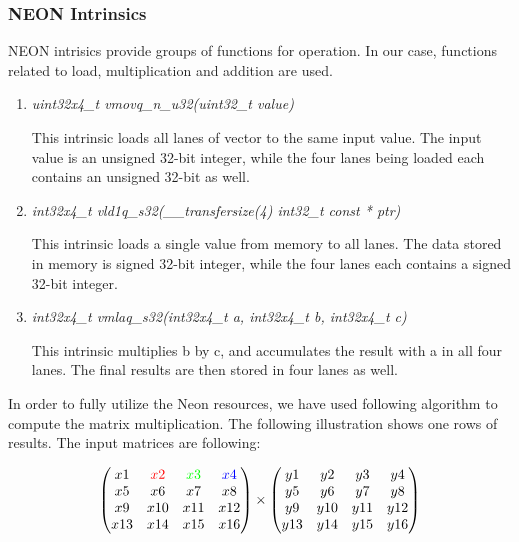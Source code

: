 \subsubsection{NEON Intrinsics}
NEON intrisics provide groups of functions for operation. 
In our case, functions related to load, multiplication and addition are used. 
\begin{enumerate}
\item \emph{uint32x4\_t  vmovq\_n\_u32(uint32\_t value)}

This intrinsic loads all lanes of vector to the same input value. 
The input value is an unsigned 32-bit integer, 
while the four lanes being loaded each contains an unsigned 32-bit as well.


\item \emph{int32x4\_t   vld1q\_s32(\_\_transfersize(4) int32\_t const * ptr)}

This intrinsic loads a single value from memory to all lanes.
The data stored in memory is signed 32-bit integer, 
while the four lanes each contains a signed 32-bit integer.

\item \emph{int32x4\_t   vmlaq\_s32(int32x4\_t a, int32x4\_t b, int32x4\_t c)}

This intrinsic multiplies b by c, and accumulates the result with a in all four lanes.
The final results are then stored in four lanes as well.
\end{enumerate}
In order to fully utilize the Neon resources, we have used following algorithm to compute the matrix multiplication. The following illustration shows one rows of results.
The input matrices are following:

$$
\begin{pmatrix}
 x1 	& \color{red}{x2} 	& \color{green}{x3} & \color{blue}{x4}\\
 x5 	& x6 				& x7&x8\\
 x9 	& x10 				& x11&x12\\
 x13 	& x14 				& x15&x16\\
\end{pmatrix}
\times
\begin{pmatrix}
y1&y2&y3&y4\\
y5&y6&y7&y8\\
y9&y10&y11&y12\\
y13&y14&y15&y16\\
\end{pmatrix}
$$


